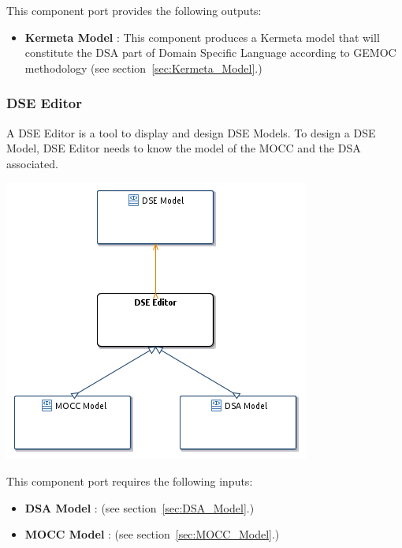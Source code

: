 \documentclass{gemoc} %
\begin{document}
This component port provides the following outputs:
\begin{itemize}
  \item \textbf{Kermeta Model} :
This component produces a Kermeta model that will constitute the DSA part of Domain Specific Language according to GEMOC methodology 
(see section~\ref{sec:Kermeta_Model}.)
\end{itemize}



\subsubsection{DSE Editor}
\label{sec:DSE_Editor}
A DSE Editor is a tool to display and design DSE Models.
\newline To design a DSE Model, DSE Editor needs to know the model of the MOCC and the DSA associated.
\begin{center}
\includegraphics*[trim=0.0cm 0.0cm 0cm 0.0cm, clip=true]{../images/generated/Generated_DSE_Editor.png}
\end{center}

This component port requires the following inputs:
\begin{itemize}
  \item \textbf{DSA Model} :
(see section~\ref{sec:DSA_Model}.)
  \item \textbf{MOCC Model} :
(see section~\ref{sec:MOCC_Model}.)
\end{itemize}
\end{document}
